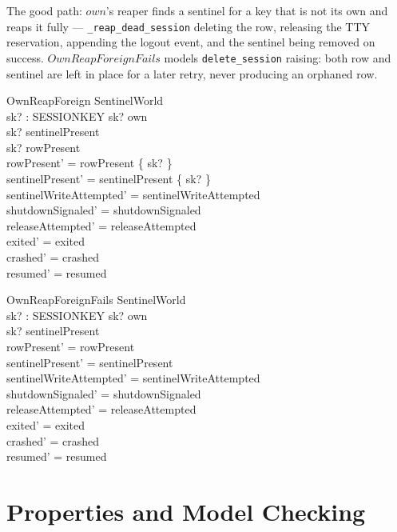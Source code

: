 \documentclass[a4paper,10pt,fleqn]{article}
\begin{document}
The good path: $own$'s reaper finds a sentinel for a key that is not
its own and reaps it fully --- \texttt{\_reap\_dead\_session} deleting
the row, releasing the TTY reservation, appending the logout event, and
the sentinel being removed on success.  $OwnReapForeignFails$ models
\texttt{delete\_session} raising: both row and sentinel are left in
place for a later retry, never producing an orphaned row.

\begin{schema}{OwnReapForeign}
  \Delta SentinelWorld \\
  sk? : SESSIONKEY
  \where
  sk? \neq own \\
  sk? \in sentinelPresent \\
  sk? \in rowPresent \\
  rowPresent' = rowPresent \setminus \{ sk? \} \\
  sentinelPresent' = sentinelPresent \setminus \{ sk? \} \\
  sentinelWriteAttempted' = sentinelWriteAttempted \\
  shutdownSignaled' = shutdownSignaled \\
  releaseAttempted' = releaseAttempted \\
  exited' = exited \\
  crashed' = crashed \\
  resumed' = resumed
\end{schema}

\begin{schema}{OwnReapForeignFails}
  \Delta SentinelWorld \\
  sk? : SESSIONKEY
  \where
  sk? \neq own \\
  sk? \in sentinelPresent \\
  rowPresent' = rowPresent \\
  sentinelPresent' = sentinelPresent \\
  sentinelWriteAttempted' = sentinelWriteAttempted \\
  shutdownSignaled' = shutdownSignaled \\
  releaseAttempted' = releaseAttempted \\
  exited' = exited \\
  crashed' = crashed \\
  resumed' = resumed
\end{schema}

\section{Properties and Model Checking}
\label{sec:modelcheck}
\end{document}
